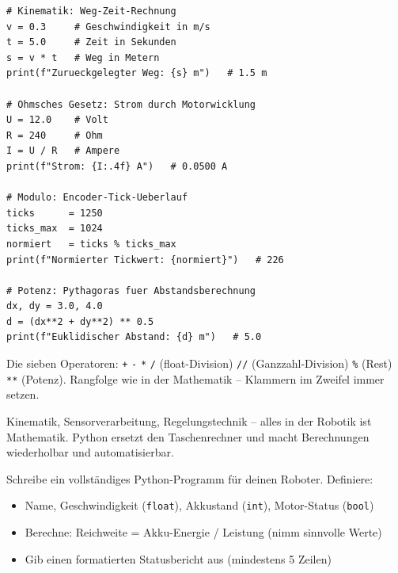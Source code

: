 \begin{lstlisting}
# Kinematik: Weg-Zeit-Rechnung
v = 0.3     # Geschwindigkeit in m/s
t = 5.0     # Zeit in Sekunden
s = v * t   # Weg in Metern
print(f"Zurueckgelegter Weg: {s} m")   # 1.5 m

# Ohmsches Gesetz: Strom durch Motorwicklung
U = 12.0    # Volt
R = 240     # Ohm
I = U / R   # Ampere
print(f"Strom: {I:.4f} A")   # 0.0500 A

# Modulo: Encoder-Tick-Ueberlauf
ticks      = 1250
ticks_max  = 1024
normiert   = ticks % ticks_max
print(f"Normierter Tickwert: {normiert}")   # 226

# Potenz: Pythagoras fuer Abstandsberechnung
dx, dy = 3.0, 4.0
d = (dx**2 + dy**2) ** 0.5
print(f"Euklidischer Abstand: {d} m")   # 5.0
\end{lstlisting}

\begin{merksatz}
Die sieben Operatoren: \texttt{+} \texttt{-} \texttt{*} \texttt{/} (float-Division) \texttt{//} (Ganzzahl-Division) \texttt{\%} (Rest) \texttt{**} (Potenz). Rangfolge wie in der Mathematik -- Klammern im Zweifel immer setzen.
\end{merksatz}

\begin{praxis}
Kinematik, Sensorverarbeitung, Regelungstechnik -- alles in der Robotik ist Mathematik. Python ersetzt den Taschenrechner und macht Berechnungen wiederholbar und automatisierbar.
\end{praxis}

\begin{uebung}[title=Projektaufgabe Modul 1: Roboter-Statusbericht]
Schreibe ein vollständiges Python-Programm für deinen Roboter. Definiere:
\begin{itemize}
    \item Name, Geschwindigkeit (\texttt{float}), Akkustand (\texttt{int}), Motor-Status (\texttt{bool})
    \item Berechne: Reichweite = Akku-Energie / Leistung (nimm sinnvolle Werte)
    \item Gib einen formatierten Statusbericht aus (mindestens 5 Zeilen)
\end{itemize}
\end{uebung}
